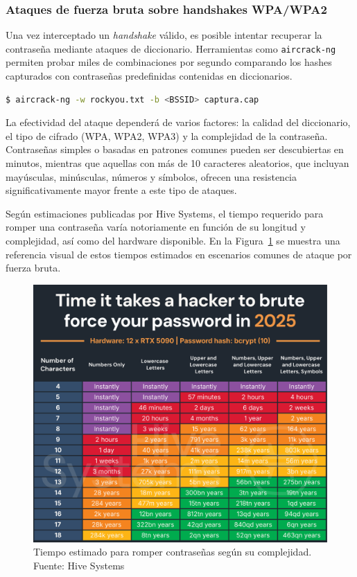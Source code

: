 \documentclass[a4paper, 11pt]{article}
\begin{document}
\subsubsection{Ataques de fuerza bruta sobre handshakes WPA/WPA2}

Una vez interceptado un \textit{handshake} válido, es posible intentar recuperar la contraseña mediante ataques de diccionario. Herramientas como \texttt{aircrack-ng} permiten probar miles de combinaciones por segundo comparando los hashes capturados con contraseñas predefinidas contenidas en diccionarios.

\begin{lstlisting}[language=bash, style=terminalstyle, caption=Fuerza bruta con aircrack-ng]
$ aircrack-ng -w rockyou.txt -b <BSSID> captura.cap
\end{lstlisting}

La efectividad del ataque dependerá de varios factores: la calidad del diccionario, el tipo de cifrado (WPA, WPA2, WPA3) y la complejidad de la contraseña. Contraseñas simples o basadas en patrones comunes pueden ser descubiertas en minutos, mientras que aquellas con más de 10 caracteres aleatorios, que incluyan mayúsculas, minúsculas, números y símbolos, ofrecen una resistencia significativamente mayor frente a este tipo de ataques.

Según estimaciones publicadas por Hive Systems, el tiempo requerido para romper una contraseña varía notoriamente en función de su longitud y complejidad, así como del hardware disponible. En la Figura~\ref{fig:crackpass} se muestra una referencia visual de estos tiempos estimados en escenarios comunes de ataque por fuerza bruta.

\begin{figure}[H]
\centering
\includegraphics[width=16cm]{images/crackpass.png}
\caption{Tiempo estimado para romper contraseñas según su complejidad. Fuente: Hive Systems}
\label{fig:crackpass}
\end{figure}
\end{document}
